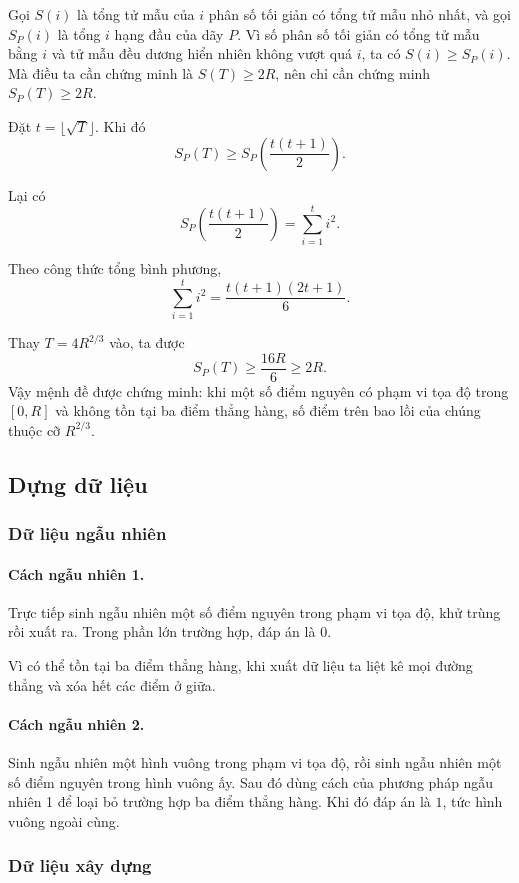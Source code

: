 \documentclass[11pt]{article}
\begin{document}
Gọi \(S(i)\) là tổng tử mẫu của \(i\) phân số tối giản có tổng tử mẫu nhỏ nhất,
và gọi \(S_P(i)\) là tổng \(i\) hạng đầu của dãy \(P\). Vì số phân số tối giản
có tổng tử mẫu bằng \(i\) và tử mẫu đều dương hiển nhiên không vượt quá \(i\),
ta có \(S(i)\ge S_P(i)\). Mà điều ta cần chứng minh là \(S(T)\ge 2R\), nên chỉ
cần chứng minh \(S_P(T)\ge 2R\).

Đặt \(t=\lfloor\sqrt{T}\rfloor\). Khi đó
\[
  S_P(T)\ge S_P\!\left(\frac{t(t+1)}{2}\right).
\]

Lại có
\[
  S_P\!\left(\frac{t(t+1)}{2}\right)=\sum_{i=1}^{t}i^2.
\]

Theo công thức tổng bình phương,
\[
  \sum_{i=1}^{t}i^2=\frac{t(t+1)(2t+1)}{6}.
\]

Thay \(T=4R^{2/3}\) vào, ta được
\[
  S_P(T)\ge \frac{16R}{6}\ge 2R.
\]
Vậy mệnh đề được chứng minh: khi một số điểm nguyên có phạm vi tọa độ trong
\([0,R]\) và không tồn tại ba điểm thẳng hàng, số điểm trên bao lồi của chúng
thuộc cỡ \(R^{2/3}\).

\subsection{Dựng dữ liệu}

\subsubsection{Dữ liệu ngẫu nhiên}

\paragraph{Cách ngẫu nhiên 1.}
Trực tiếp sinh ngẫu nhiên một số điểm nguyên trong phạm vi tọa độ, khử trùng
rồi xuất ra. Trong phần lớn trường hợp, đáp án là \(0\).

Vì có thể tồn tại ba điểm thẳng hàng, khi xuất dữ liệu ta liệt kê mọi đường
thẳng và xóa hết các điểm ở giữa.

\paragraph{Cách ngẫu nhiên 2.}
Sinh ngẫu nhiên một hình vuông trong phạm vi tọa độ, rồi sinh ngẫu nhiên một
số điểm nguyên trong hình vuông ấy. Sau đó dùng cách của phương pháp ngẫu nhiên
1 để loại bỏ trường hợp ba điểm thẳng hàng. Khi đó đáp án là \(1\), tức hình
vuông ngoài cùng.

\subsubsection{Dữ liệu xây dựng}
\end{document}
